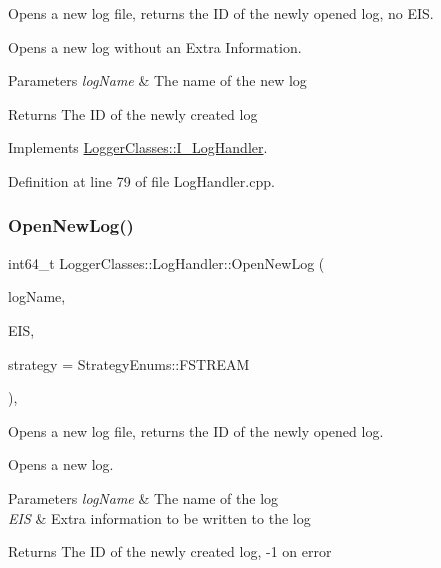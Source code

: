Opens a new log file, returns the ID of the newly opened log, no E\+IS. 

Opens a new log without an Extra Information.


\begin{DoxyParams}{Parameters}
{\em log\+Name} & The name of the new log \\
\hline
\end{DoxyParams}
\begin{DoxyReturn}{Returns}
The ID of the newly created log 
\end{DoxyReturn}


Implements \mbox{\hyperlink{classLoggerClasses_1_1I__LogHandler_af3f21c5055e10cd7be79264de3345eb4}{Logger\+Classes\+::\+I\+\_\+\+Log\+Handler}}.



Definition at line 79 of file Log\+Handler.\+cpp.

\mbox{\label{classLoggerClasses_1_1LogHandler_afeb4c6f0786cb9ae1d0488955d72aa4b}} 
\subsubsection{\texorpdfstring{OpenNewLog()}{OpenNewLog()}\hspace{0.1cm}{\footnotesize\ttfamily [2/2]}}
{\footnotesize\ttfamily int64\+\_\+t Logger\+Classes\+::\+Log\+Handler\+::\+Open\+New\+Log (\begin{DoxyParamCaption}\item[{const std\+::string \&}]{log\+Name,  }\item[{const std\+::string \&}]{E\+IS,  }\item[{Strategy\+Enums}]{strategy = {\ttfamily StrategyEnums\+:\+:FSTREAM} }\end{DoxyParamCaption})\hspace{0.3cm}{\ttfamily [override]}, {\ttfamily [virtual]}}



Opens a new log file, returns the ID of the newly opened log. 

Opens a new log.


\begin{DoxyParams}{Parameters}
{\em log\+Name} & The name of the log \\
\hline
{\em E\+IS} & Extra information to be written to the log \\
\hline
\end{DoxyParams}
\begin{DoxyReturn}{Returns}
The ID of the newly created log, -\/1 on error 
\end{DoxyReturn}


